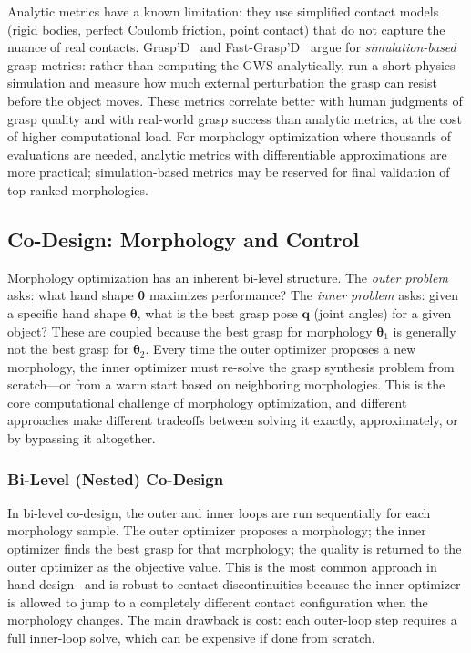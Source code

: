 \documentclass[journal]{IEEEtran}
\newcommand{\btheta}{\boldsymbol{\theta}}
\newcommand{\bq}{\mathbf{q}}
\begin{document}
Analytic metrics have a known limitation: they use simplified contact models (rigid bodies,
perfect Coulomb friction, point contact) that do not capture the nuance of real contacts.
Grasp'D~\cite{graspd2022} and Fast-Grasp'D~\cite{fastgraspd2023} argue for
\emph{simulation-based} grasp metrics: rather than computing the GWS analytically, run a
short physics simulation and measure how much external perturbation the grasp can resist
before the object moves.
These metrics correlate better with human judgments of grasp quality and with real-world
grasp success than analytic metrics, at the cost of higher computational load.
For morphology optimization where thousands of evaluations are needed, analytic metrics
with differentiable approximations are more practical; simulation-based metrics may be
reserved for final validation of top-ranked morphologies.

\subsection{Co-Design: Morphology and Control}
\label{sec:related_codesign}

\begin{notebox}
Morphology optimization has an inherent bi-level structure.
The \emph{outer problem} asks: what hand shape $\btheta$ maximizes performance?
The \emph{inner problem} asks: given a specific hand shape $\btheta$, what is the
best grasp pose $\bq$ (joint angles) for a given object?
These are coupled because the best grasp for morphology $\btheta_1$ is generally
not the best grasp for $\btheta_2$.
Every time the outer optimizer proposes a new morphology, the inner optimizer must
re-solve the grasp synthesis problem from scratch---or from a warm start based on
neighboring morphologies.
This is the core computational challenge of morphology optimization, and different
approaches make different tradeoffs between solving it exactly, approximately, or
by bypassing it altogether.
\end{notebox}

\subsubsection{Bi-Level (Nested) Co-Design}

In bi-level co-design, the outer and inner loops are run sequentially for each morphology
sample.
The outer optimizer proposes a morphology; the inner optimizer finds the best grasp for
that morphology; the quality is returned to the outer optimizer as the objective value.
This is the most common approach in hand design~\cite{hazard2020automated,
mannam2024codesign} and is robust to contact discontinuities because the inner optimizer
is allowed to jump to a completely different contact configuration when the morphology
changes.
The main drawback is cost: each outer-loop step requires a full inner-loop solve,
which can be expensive if done from scratch.
\end{document}
